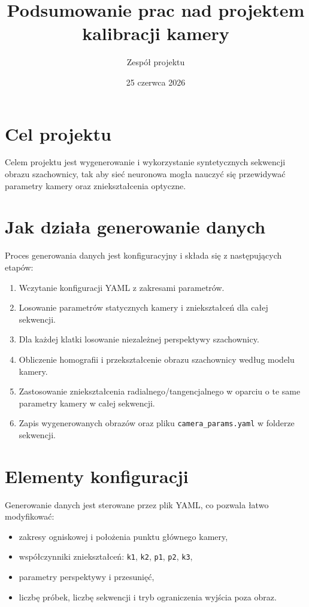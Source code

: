 \documentclass[11pt,a4paper]{article}
\title{Podsumowanie prac nad projektem kalibracji kamery}
\author{Zespół projektu}
\date{25 czerwca 2026}
\begin{document}
\maketitle

\section*{Cel projektu}
Celem projektu jest wygenerowanie i wykorzystanie syntetycznych sekwencji obrazu szachownicy, tak aby sieć neuronowa mogła nauczyć się przewidywać parametry kamery oraz zniekształcenia optyczne.

\section{Jak działa generowanie danych}
Proces generowania danych jest konfiguracyjny i składa się z następujących etapów:
\begin{enumerate}[leftmargin=*]
    \item Wczytanie konfiguracji YAML z zakresami parametrów.
    \item Losowanie parametrów statycznych kamery i zniekształceń dla całej sekwencji.
    \item Dla każdej klatki losowanie niezależnej perspektywy szachownicy.
    \item Obliczenie homografii i przekształcenie obrazu szachownicy według modelu kamery.
    \item Zastosowanie zniekształcenia radialnego/tangencjalnego w oparciu o te same parametry kamery w całej sekwencji.
    \item Zapis wygenerowanych obrazów oraz pliku \texttt{camera_params.yaml} w folderze sekwencji.
\end{enumerate}

\section{Elementy konfiguracji}
Generowanie danych jest sterowane przez plik YAML, co pozwala łatwo modyfikować:
\begin{itemize}[leftmargin=*]
    \item zakresy ogniskowej i położenia punktu głównego kamery,
    \item współczynniki zniekształceń: \texttt{k1}, \texttt{k2}, \texttt{p1}, \texttt{p2}, \texttt{k3},
    \item parametry perspektywy i przesunięć,
    \item liczbę próbek, liczbę sekwencji i tryb ograniczenia wyjścia poza obraz.
\end{itemize}
\end{document}
